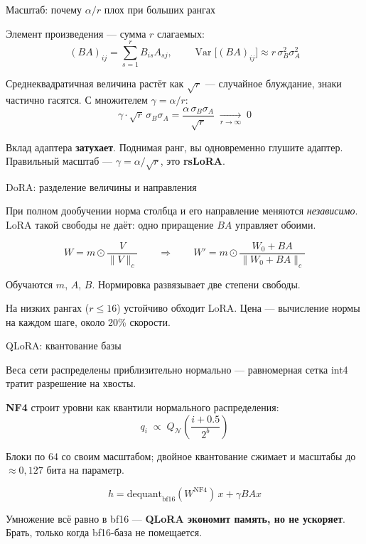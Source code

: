 \documentclass[11pt,aspectratio=169]{beamer}
\newcommand{\key}[1]{%
  \begin{center}\colorbox{boxbg}{\parbox{0.92\textwidth}{\vspace{2pt}#1\vspace{2pt}}}\end{center}}
\newcommand{\aside}[1]{{\color{dim}\small #1}}
\newcommand{\Var}{\operatorname{Var}}
\begin{document}
\begin{frame}{Масштаб: почему $\alpha/r$ плох при больших рангах}

Элемент произведения — сумма $r$ слагаемых:
\[
(BA)_{ij} = \sum_{s=1}^{r} B_{is}A_{sj},
\qquad
\Var\big[(BA)_{ij}\big] \approx r\,\sigma_B^2\sigma_A^2
\]

Среднеквадратичная величина растёт как $\sqrt{r}$ — случайное блуждание,
знаки частично гасятся. С множителем $\gamma = \alpha/r$:
\[
\gamma\cdot\sqrt{r}\,\sigma_B\sigma_A
= \frac{\alpha\,\sigma_B\sigma_A}{\sqrt{r}}
\;\xrightarrow[r\to\infty]{}\; 0
\]

\key{Вклад адаптера \textbf{затухает}. Поднимая ранг, вы одновременно
глушите адаптер. Правильный масштаб — $\gamma = \alpha/\sqrt{r}$,
это \textbf{rsLoRA}.}

\end{frame}

\begin{frame}{DoRA: разделение величины и направления}

При полном дообучении норма столбца и его направление меняются
\emph{независимо}. LoRA такой свободы не даёт: одно приращение $BA$
управляет обоими.

\vspace{0.8em}
\[
W = m \odot \frac{V}{\lVert V\rVert_c}
\qquad\Longrightarrow\qquad
W' = m \odot \frac{W_0 + BA}{\lVert W_0 + BA\rVert_c}
\]

\vspace{0.5em}
Обучаются $m$, $A$, $B$. Нормировка развязывает две степени свободы.

\vspace{1em}
\aside{На низких рангах ($r \le 16$) устойчиво обходит LoRA. Цена —
вычисление нормы на каждом шаге, около 20\% скорости.}

\end{frame}

\begin{frame}{QLoRA: квантование базы}

Веса сети распределены приблизительно нормально — равномерная сетка
int4 тратит разрешение на хвосты.

\vspace{0.5em}
\textbf{NF4} строит уровни как квантили нормального распределения:
\[
q_i \;\propto\; Q_{\mathcal{N}}\!\left(\frac{i+0.5}{2^b}\right)
\]

Блоки по 64 со своим масштабом; двойное квантование сжимает и масштабы
до $\approx 0{,}127$ бита на параметр.

\vspace{0.8em}
\[
h = \text{dequant}_{\text{bf16}}(W^{\text{NF4}})\,x + \gamma BAx
\]

\key{Умножение всё равно в bf16 — \textbf{QLoRA экономит память, но не
ускоряет}. Брать, только когда bf16-база не помещается.}

\end{frame}
\end{document}
